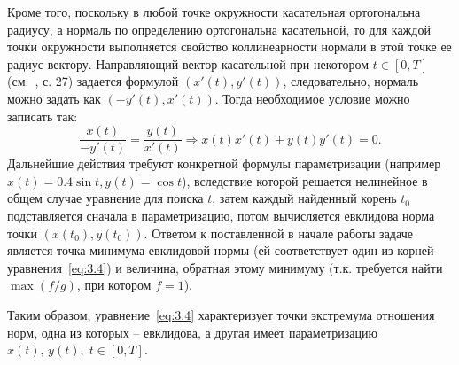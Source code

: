 \documentclass{article}
\begin{document}
Кроме того, поскольку в любой точке окружности касательная ортогональна радиусу, а нормаль по определению ортогональна касательной, то для каждой точки окружности выполняется свойство коллинеарности нормали в этой точке ее радиус-вектору.
Направляющий вектор касательной при некотором $t \in [0, T]$ (см.~\cite{Ignatyev}, с. 27) задается формулой $(x'(t), y'(t))$, следовательно, нормаль можно задать как $(-y'(t), x'(t))$. Тогда необходимое условие можно записать так:
\begin{equation} \label{eq:3.4}
\frac{x(t)}{-y'(t)} = \frac{y(t)}{x'(t)} \Rightarrow x(t)x'(t) + y(t)y'(t) = 0.
\end{equation}
Дальнейшие действия требуют конкретной формулы параметризации (например $x(t) = 0.4\sin{t}, y(t) = \cos{t}$), вследствие которой решается нелинейное в общем случае уравнение для поиска $t$, затем каждый найденный корень $t_0$ подставляется сначала в параметризацию, потом вычисляется евклидова норма точки
\newline 
$(x(t_0), y(t_0))$. Ответом к поставленной в начале работы задаче является точка минимума евклидовой нормы (ей соответствует один из корней уравнения~\eqref{eq:3.4}) и величина, обратная этому минимуму (т.к. требуется найти $\max{(f/g)}$, при котором $f=1$).

\vspace{1mm}
Таким образом, уравнение~\eqref{eq:3.4} характеризует точки экстремума отношения норм, одна из которых -- евклидова, а другая имеет параметризацию $x(t), \, y(t), \; t \in [0, T] $.
\end{document}
